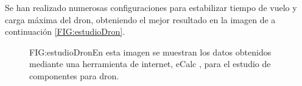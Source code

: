 
Se han realizado numerosas configuraciones para estabilizar tiempo de vuelo y carga máxima del dron, obteniendo el mejor resultado en la imagen de a continuación \ref{FIG:estudioDron}.
\begin{figure}[Estudio técnico de dron]{FIG:estudioDron}{En esta imagen se muestran los datos obtenidos mediante una herramienta de internet, eCalc \cite{DroneConfig}, para el estudio de componentes para dron.}
\end{figure}